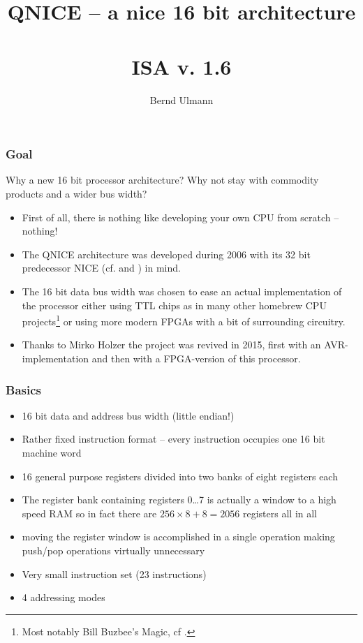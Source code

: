 \documentclass{beamer}
\title{QNICE -- a nice 16 bit architecture\\~\\ISA v. 1.6}
\author{Bernd Ulmann}
\begin{document}
 \begin{frame}
  \titlepage
 \end{frame}
%
   \begin{frame}
    \frametitle{Goal}
    Why a new 16 bit processor architecture? Why not stay with commodity
    products and a wider bus width?
    \begin{itemize}
     \item First of all, there is nothing like developing your own CPU
      from scratch -- nothing!
     \item The QNICE architecture was developed during 2006 with its
      32 bit predecessor NICE (cf. \cite{nice} and \cite{nice_html}) in
      mind. 
     \item The 16 bit data bus width was chosen to ease an actual 
      implementation of the processor either using TTL chips as in many
      other homebrew CPU projects\footnote{Most notably Bill Buzbee's
      Magic, cf \cite{magic}.} or using more modern FPGAs with a bit
      of surrounding circuitry.
     \item Thanks to Mirko Holzer the project was revived in 2015, 
      first with an AVR-implementation and then with a FPGA-version of
      this processor.
    \end{itemize}
   \end{frame}
%
   \begin{frame}
    \frametitle{Basics}
    \begin{itemize}
     \item 16 bit data and address bus width (little endian!)
     \item Rather fixed instruction format -- every instruction occupies
      one 16 bit machine word
     \item 16 general purpose registers divided into two banks of eight
      registers each
     \item The register bank containing registers 0\dots 7 is actually
      a window to a high speed RAM so in fact there are $256\times 8+8=2056$ 
      registers all in all
     \item moving the register window is accomplished in a single operation
      making push/pop operations virtually unnecessary
     \item Very small instruction set (23 instructions)
     \item 4 addressing modes
    \end{itemize}
   \end{frame}
\end{document}
